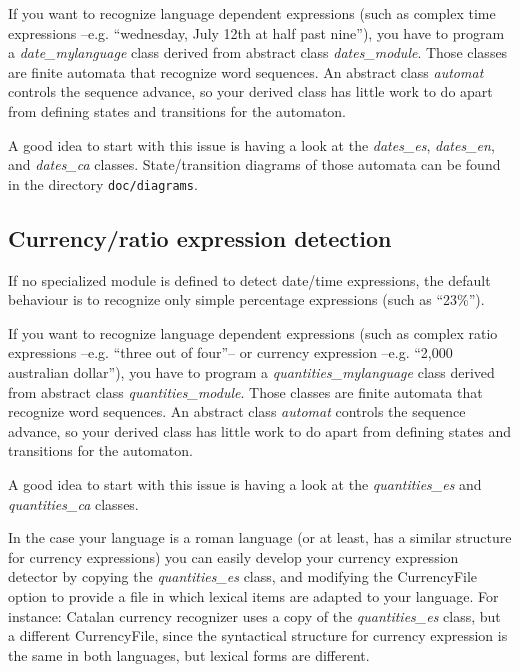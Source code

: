 \documentclass[a4paper]{book}
\begin{document}
    If you want to recognize language dependent expressions (such as
    complex time expressions --e.g. ``wednesday, July 12th at half
    past nine''), you have to program a {\em date\_mylanguage} class
    derived from abstract class {\em dates\_module}.  Those classes
    are finite automata that recognize word sequences. An abstract
    class {\em automat} controls the sequence advance, so your derived
    class has little work to do apart from defining states and
    transitions for the automaton.

    A good idea to start with this issue is having a look at the 
    {\em dates\_es}, {\em dates\_en}, and {\em dates\_ca} classes.
    State/transition diagrams of those automata can be found in the
    directory {\tt doc/diagrams}.

   \subsection{Currency/ratio expression detection} If no specialized
    module is defined to detect date/time expressions, the default
    behaviour is to recognize only simple percentage expressions (such
    as ``23\%'').
  
    If you want to recognize language dependent expressions (such as
    complex ratio expressions --e.g. ``three out of four''-- or
    currency expression --e.g. ``2,000 australian dollar''), you have
    to program a {\em quantities\_mylanguage} class derived from
    abstract class {\em quantities\_module}.  Those classes are finite
    automata that recognize word sequences. An abstract class {\em
    automat} controls the sequence advance, so your derived class has
    little work to do apart from defining states and transitions for
    the automaton.

    A good idea to start with this issue is having a look at the {\em
    quantities\_es} and {\em quantities\_ca}
    classes.  

    In the case your language is a roman language (or at least, has a
    similar structure for currency expressions) you can easily develop
    your currency expression detector by copying the {\em quantities\_es}
    class, and modifying the CurrencyFile option to provide a file in
    which lexical items are adapted to your language.
    For instance: Catalan currency recognizer uses a copy of the 
    {\em quantities\_es} class, but a different CurrencyFile, since
    the syntactical structure for currency expression is the same in
    both languages, but lexical forms are different.
\end{document}
